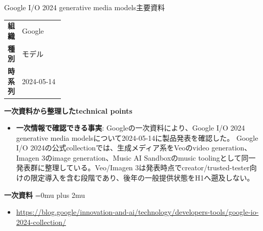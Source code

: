 \Needspace{0.38\textheight}
\begin{technicalnote}{Google I/O 2024 generative media models}{主要資料}
\begingroup
\begin{tabularx}{\linewidth}{@{}>{\bfseries}p{0.22\linewidth}X@{}}
組織 & Google \\
種別 & モデル \\
時系列 & 2024-05-14 \\
\end{tabularx}
\smallskip
\begin{minipage}{\linewidth}
{\bfseries 一次資料から整理したtechnical points}
\begin{itemize}[leftmargin=1.5em,itemsep=0.35em]
\item \textbf{一次情報で確認できる事実}: Googleの一次資料により、Google I/O 2024 generative media modelsについて2024-05-14に製品発表を確認した。 Google I/O 2024の公式collectionでは、生成メディア系をVeoのvideo generation、Imagen 3のimage generation、Music AI Sandboxのmusic toolingとして同一発表群に整理している。Veo/Imagen 3は発表時点でcreator/trusted-tester向けの限定導入を含む段階であり、後年の一般提供状態をH1へ遡及しない。
\end{itemize}
\begin{minipage}{\linewidth}
\begin{samepage}
{\bfseries 一次資料}
\begingroup\sloppy
\Urlmuskip=0mu plus 2mu\relax
\begin{itemize}[leftmargin=1.5em,itemsep=0.25em]
\item {\scriptsize\url{https://blog.google/innovation-and-ai/technology/developers-tools/google-io-2024-collection/}}
\end{itemize}
\endgroup
\end{samepage}
\end{minipage}
\end{minipage}
\endgroup
\end{technicalnote}
\medskip

